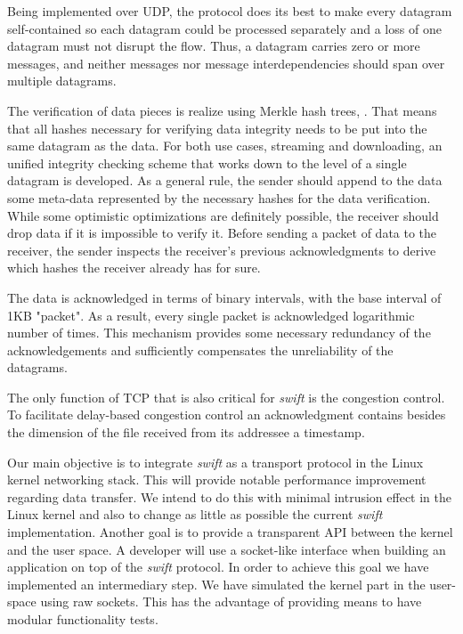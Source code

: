 Being implemented over UDP, the protocol does its best to make every datagram
self-contained so each datagram could be processed separately and a loss of
one datagram must not disrupt the flow. Thus, a datagram carries zero or more
messages, and neither messages nor message interdependencies should span over
multiple datagrams.

The verification of data pieces is realize using Merkle hash
trees\cite{merkle}, \cite{merkle-ext}. That means that all hashes necessary
for verifying data integrity needs to be put into the same datagram as the
data. For both use cases, streaming and downloading, an unified  integrity
checking scheme that works down to the level of a single datagram is
developed. As a general rule, the sender should append to the data some
meta-data represented by the necessary hashes for the data verification. While
some optimistic optimizations are definitely possible, the receiver should
drop data if it is impossible to verify it. Before sending a packet of data to
the receiver, the sender inspects the receiver's previous acknowledgments to
derive which hashes the receiver already has for sure.

The data is acknowledged in terms of binary intervals, with the base interval
of 1KB "packet". As a result, every single packet is acknowledged logarithmic
number of times. This mechanism provides some necessary redundancy of the
acknowledgements and sufficiently compensates the unreliability of the
datagrams.

The only function of TCP that is also critical for \textit{swift} is the
congestion control. To facilitate delay-based congestion control an
acknowledgment contains besides the dimension of the file received from its
addressee a timestamp.

Our main objective is to integrate \textit{swift} as a transport protocol in
the Linux kernel networking stack. This will provide notable performance
improvement regarding data transfer. We intend to do this with minimal
intrusion effect in the Linux kernel and also to change as little as possible
the current \textit{swift} implementation. Another goal is to provide a
transparent API between the kernel and the user space. A developer will use a
socket-like interface when building an application on top of the
\textit{swift} protocol. In order to achieve this goal we have implemented an
intermediary step. We have simulated the kernel part in the user-space using
raw sockets. This has the advantage of providing means to have modular
functionality tests.

